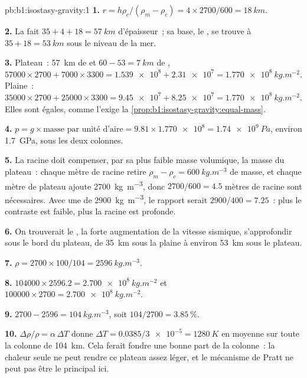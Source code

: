 \begin{solution}{pb:b1:isostasy-gravity:1}
\textbf{1.} $r = h\rho_c/(\rho_m - \rho_c) = 4\times2700/600 = \qty{18}{km}$.

\textbf{2.} La  fait $35 + 4 + 18 = \qty{57}{km}$ d'épaisseur~; sa base, le ,
se trouve à $35 + 18 = \qty{53}{km}$ sous le niveau de la mer.

\textbf{3.} Plateau~: \qty{57}{km} de  et $60 - 53 = \qty{7}{km}$ de ,
$\num{57000}\times2700 + \num{7000}\times3300 = \num{1.539e8} + \num{2.31e7} =
\qty{1.770e8}{kg.m^{-2}}$. Plaine~: $\num{35000}\times2700 + \num{25000}\times3300
= \num{9.45e7} + \num{8.25e7} = \qty{1.770e8}{kg.m^{-2}}$. Elles sont égales, comme
l'exige la \cref{prop:b1:isostasy-gravity:equal-mass}.

\textbf{4.} $p = g\times\text{masse par unité d'aire} = 9.81\times\num{1.770e8} =
\qty{1.74e9}{Pa}$, environ \qty{1.7}{GPa}, sous les deux colonnes.

\textbf{5.} La racine doit compenser, par sa plus faible masse volumique, la masse du
plateau~: chaque mètre de racine retire $\rho_m - \rho_c = \qty{600}{kg.m^{-3}}$ de
masse, et chaque mètre de plateau ajoute \qty{2700}{kg.m^{-3}}, donc $2700/600 = 4.5$
mètres de racine sont nécessaires. Avec une  de \qty{2900}{kg.m^{-3}}, le rapport
serait $2900/400 = 7.25$~: plus le contraste est faible, plus la racine est profonde.

\textbf{6.} On trouverait le , la forte augmentation de la vitesse sismique,
s'approfondir sous le bord du plateau, de \qty{35}{km} sous la plaine
à environ \qty{53}{km} sous le plateau.

\textbf{7.} $\rho = 2700\times100/104 = \qty{2596}{kg.m^{-3}}$.

\textbf{8.} $\num{104000}\times2596.2 = \qty{2.700e8}{kg.m^{-2}}$ et
$\num{100000}\times2700 = \qty{2.700e8}{kg.m^{-2}}$.

\textbf{9.} $2700 - 2596 = \qty{104}{kg.m^{-3}}$, soit $104/2700 =
\qty{3.85}{\percent}$.

\textbf{10.} $\Delta\rho/\rho = \alpha\,\Delta T$ donne $\Delta T =
0.0385/\num{3e-5} = \qty{1280}{K}$ en moyenne sur toute la colonne de \qty{104}{km}.
Cela ferait fondre une bonne part de la colonne~: la chaleur seule ne peut rendre ce
plateau assez léger, et le mécanisme de Pratt ne peut pas être le principal ici.


\end{solution}
